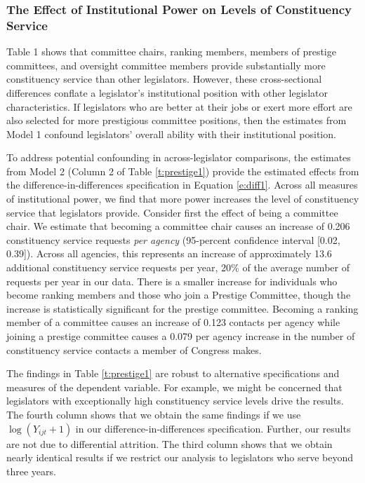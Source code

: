 \documentclass[12pt]{article}
\begin{document}
\subsubsection{The Effect of Institutional Power on Levels of Constituency Service}\label{s:prestigeresults} 

Table 1 shows that committee chairs, ranking members, members of prestige committees, and oversight committee members provide substantially more constituency service than other legislators. However, these cross-sectional differences conflate a legislator's institutional position with other legislator characteristics. If legislators who are better at their jobs or exert more effort are also selected for more prestigious committee positions, then the estimates from Model 1 confound legislators' overall ability with their institutional position.   




To address potential confounding in across-legislator comparisons, the estimates from Model 2 (Column 2 of Table \ref{t:prestige1}) provide the estimated effects from the difference-in-differences specification in Equation \ref{e:diff1}. Across all measures of institutional power, we find that more power increases the level of constituency service that legislators provide. Consider first the effect of being a committee chair. We estimate that becoming a committee chair causes an increase of 0.206 constituency service requests \textit{per agency} (95-percent confidence interval [0.02, 0.39]). Across all agencies, this represents an increase of approximately 13.6 additional constituency service requests per year, 20\% of the average number of requests per year in our data. There is a smaller increase for individuals who become ranking members and those who join a Prestige Committee, though the increase is statistically significant for the prestige committee. Becoming a ranking member of a committee causes an increase of 0.123 contacts per agency while joining a prestige committee causes a 0.079 per agency increase in the number of constituency service contacts a member of Congress makes.

The findings in Table \ref{t:prestige1} are robust to alternative specifications and measures of the dependent variable. For example, we might be concerned that legislators with exceptionally high constituency service levels drive the results. The fourth column shows that we obtain the same findings if we use $\log (Y_{ijt} + 1)$ in our difference-in-differences specification. Further, our results are not due to differential attrition. The third column shows that we obtain nearly identical results if we restrict our analysis to legislators who serve beyond three years.    
\end{document}

